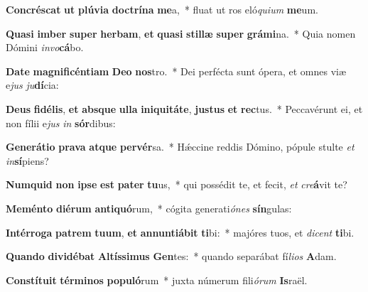 \item \textbf{Con}\textbf{crés}\textbf{cat} \textbf{ut} \textbf{plú}\textbf{vi}\textbf{a} \textbf{doc}\textbf{trí}\textbf{na} \textbf{me}a,~* fluat ut ros eló\textit{qui}\textit{um} \textbf{me}um.
\item \textbf{Qua}\textbf{si} \textbf{im}\textbf{ber} \textbf{su}\textbf{per} \textbf{her}\textbf{bam}, \textbf{et} \textbf{qua}\textbf{si} \textbf{stil}\textbf{læ} \textbf{su}\textbf{per} \textbf{grá}\textbf{mi}na.~* Quia nomen Dómini \textit{in}\textit{vo}\textbf{cá}bo.
\item \textbf{Da}\textbf{te} \textbf{ma}\textbf{gni}\textbf{fi}\textbf{cén}\textbf{ti}\textbf{am} \textbf{De}\textbf{o} \textbf{nos}tro.~* Dei perfécta sunt ópera, et omnes viæ e\textit{jus} \textit{ju}\textbf{dí}cia:
\item \textbf{De}\textbf{us} \textbf{fi}\textbf{dé}\textbf{lis}, \textbf{et} \textbf{abs}\textbf{que} \textbf{ul}\textbf{la} \textbf{in}\textbf{i}\textbf{qui}\textbf{tá}\textbf{te}, \textbf{jus}\textbf{tus} \textbf{et} \textbf{rec}tus.~* Peccavérunt ei, et non fílii e\textit{jus} \textit{in} \textbf{sór}dibus:
\item \textbf{Ge}\textbf{ne}\textbf{rá}\textbf{ti}\textbf{o} \textbf{pra}\textbf{va} \textbf{at}\textbf{que} \textbf{per}\textbf{vér}sa.~* Hǽccine reddis Dómino, pópule stulte \textit{et} \textit{in}\textbf{sí}piens?
\item \textbf{Num}\textbf{quid} \textbf{non} \textbf{ip}\textbf{se} \textbf{est} \textbf{pa}\textbf{ter} \textbf{tu}us,~* qui possédit te, et fecit, \textit{et} \textit{cre}\textbf{á}vit te?
\item \textbf{Me}\textbf{mén}\textbf{to} \textbf{di}\textbf{é}\textbf{rum} \textbf{an}\textbf{ti}\textbf{quó}rum,~* cógita generati\textit{ó}\textit{nes} \textbf{sín}gulas:
\item \textbf{In}\textbf{tér}\textbf{ro}\textbf{ga} \textbf{pa}\textbf{trem} \textbf{tu}\textbf{um}, \textbf{et} \textbf{an}\textbf{nun}\textbf{ti}\textbf{á}\textbf{bit} \textbf{ti}bi:~* majóres tuos, et \textit{di}\textit{cent} \textbf{ti}bi.
\item \textbf{Quan}\textbf{do} \textbf{di}\textbf{vi}\textbf{dé}\textbf{bat} \textbf{Al}\textbf{tís}\textbf{si}\textbf{mus} \textbf{Gen}tes:~* quando separábat fí\textit{li}\textit{os} \textbf{A}dam.
\item \textbf{Con}\textbf{stí}\textbf{tu}\textbf{it} \textbf{tér}\textbf{mi}\textbf{nos} \textbf{po}\textbf{pu}\textbf{ló}rum~* juxta númerum fili\textit{ó}\textit{rum} \textbf{Is}raël.
